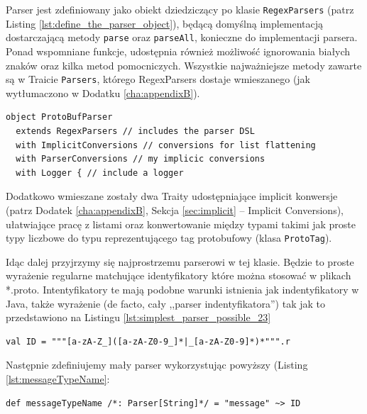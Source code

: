\documentclass[pdflatex,11pt]{aghdpl}
\begin{document}
Parser jest zdefiniowany jako obiekt dziedziczący po klasie \verb|RegexParsers| (patrz Listing \ref{lst:define_the_parser_object}), będącą domyślną implementacją
dostarczającą metody \verb|parse| oraz \verb|parseAll|, konieczne do implementacji parsera. Ponad wspomniane funkcje,
udostępnia również możliwość ignorowania białych znaków oraz kilka metod pomocniczych. Wszystkie najważniejsze metody 
zawarte są w Traicie \verb|Parsers|, którego RegexParsers dostaje wmieszanego (jak wytłumaczono w Dodatku \ref{cha:appendixB}).

\begin{lstlisting}[caption={Definicja obiektu parsera}, label={lst:define_the_parser_object}]
object ProtoBufParser
  extends RegexParsers // includes the parser DSL
  with ImplicitConversions // conversions for list flattening
  with ParserConversions // my implicic conversions
  with Logger { // include a logger
\end{lstlisting}

Dodatkowo wmieszane zostały dwa Traity udostępniające implicit konwersje (patrz Dodatek \ref{cha:appendixB}, Sekcja \ref{sec:implicit} -- Implicit Conversions),
ułatwiające pracę z listami oraz konwertowanie między typami takimi jak proste typy liczbowe do typu reprezentującego tag protobufowy (klasa \verb|ProtoTag|).

Idąc dalej przyjrzymy się najprostrzemu parserowi w tej klasie. Będzie to proste wyrażenie regularne matchujące identyfikatory które można stosować w 
plikach *.proto. Intentyfikatory te mają podobne warunki istnienia jak indentyfikatory w Java, także wyrażenie (de facto, cały ,,parser indentyfikatora'') 
tak jak to przedstawiono na Listingu \ref{lst:simplest_parser_possible_23}

\begin{lstlisting}[caption={Bardzo prosty parser, zdefiniowany za pomocą implicita, który rozszerza API klasy String o metodę \textit{r} tworzącą wyrażenie regularne (instancję klasy \textit{scala.util.matching.Regex})},label={lst:simplest_parser_possible_23}]
val ID = """[a-zA-Z_]([a-zA-Z0-9_]*|_[a-zA-Z0-9]*)*""".r
\end{lstlisting}

Następnie zdefiniujemy mały parser wykorzystując powyższy (Listing \ref{lst:messageTypeName}:

\begin{lstlisting}[caption={Definicja parsera identyfikatora wiadomości}, label={lst:messageTypeName}]
def messageTypeName /*: Parser[String]*/ = "message" ~> ID
\end{lstlisting}
\end{document}
